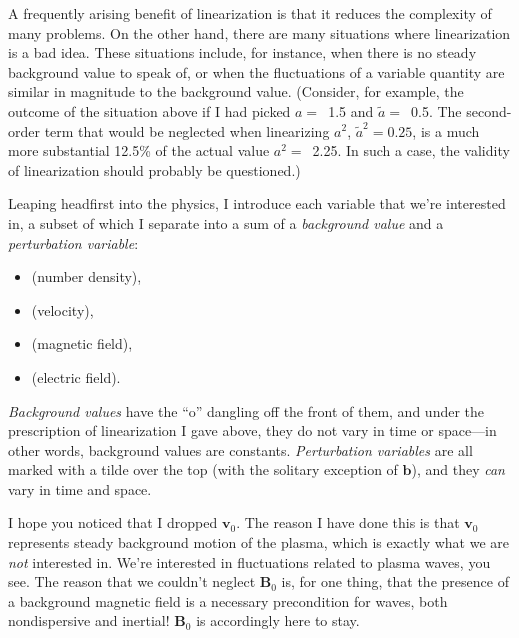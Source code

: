 A frequently arising benefit of linearization is that it reduces the complexity
of many problems. On the other hand, there are many situations where
linearization is a bad idea. These situations include, for instance, when there
is no steady background value to speak of, or when the fluctuations of a
variable quantity are similar in magnitude to the background value. (Consider,
for example, the outcome of the situation above if I had picked $a =$~1.5 and
$\tilde a =$~0.5. The second-order term that would be neglected when linearizing
$a^2$, $\tilde a^2 = 0.25$, is a much more substantial 12.5\% of the actual
value $a^2 =$~2.25. In such a case, the validity of linearization should
probably be questioned.)

Leaping headfirst into the physics, I introduce each variable that we're
interested in, a subset of which I separate into a sum of a \emph{background
  value} and a \emph{perturbation variable}: \par
\begin{itemize}
\item {} (number density),
\item {} (velocity),
\item {} (magnetic field),
\item {} (electric field).
\end{itemize}
\emph{Background values} have the ``o'' dangling off the front of them, and
under the prescription of linearization I gave above, they do not vary in time
or space---in other words, background values are constants. \emph{Perturbation
  variables} are all marked with a tilde over the top (with the solitary
exception of $\mathbf{b}$), and they \emph{can} vary in time and space.

I hope you noticed that I dropped $\mathbf{v}_0$. The reason I have done this is
that $\mathbf{v}_0$ represents steady background motion of the plasma, which is
exactly what we are \emph{not} interested in. We're interested in fluctuations
related to plasma waves, you see. The reason that we couldn't neglect
$\mathbf{B}_0$ is, for one thing, that the presence of a background magnetic
field is a necessary precondition for \Alf waves, both nondispersive and
inertial! $\mathbf{B}_0$ is accordingly here to stay.

